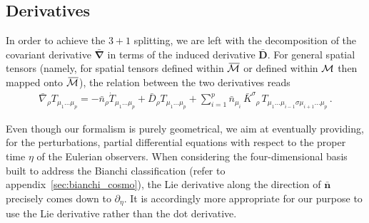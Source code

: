 \documentclass[notitlepage,onecolumn,floatfix,preprintnumbers,aps,prd,showpacs,nofootinbib,amsmath,amssymb,amsfonts]{revtex4-1}
\newcommand{\<}{\langle}
\renewcommand{\>}{\rangle}
\begin{document}
\subsection{Derivatives}

In order to achieve the $3+1$ splitting, we are left with the decomposition of the covariant derivative 
$\bm{\bar \nabla}$ in terms of the induced derivative $\bar{\bm D}$. 
For general spatial tensors (namely, for spatial tensors defined within $\, \overline{\! \cal M}$ or defined within $\cal M$ 
then mapped onto $\, \overline{\! \cal M}$), the relation between the two derivatives reads 
\begin{align}
	\bar \nabla_\rho  T_{\mu_1 \dots \mu_p} 
		= - \bar n_\rho \dot{T}_{\mu_1 \dots \mu_p} 
		+ \bar D_\rho T_{\mu_1 \dots \mu_p} 
		+ \sum_{i=1}^{p} \bar n_{\mu_i} \, \bar K^{\sigma}_{\phantom{\sigma} \rho} \, T_{\mu_1 \dots \mu_{i-1} \sigma \mu_{i+1} \dots \mu_p} \, . 
	\label{eq:cov_der}
\end{align}

Even though our formalism is purely geometrical, we aim at eventually providing, for the perturbations, 
partial differential equations with respect to the proper time $\eta$ of the Eulerian observers. 
When considering the four-dimensional basis built to address the Bianchi classification (refer to appendix~\ref{sec:bianchi_cosmo}), 
the Lie derivative along the direction of $\bm{\bar n}$ precisely comes down to $\partial_\eta$. 
It is accordingly more appropriate for our purpose to use the Lie derivative rather than the dot derivative. 
\end{document}
